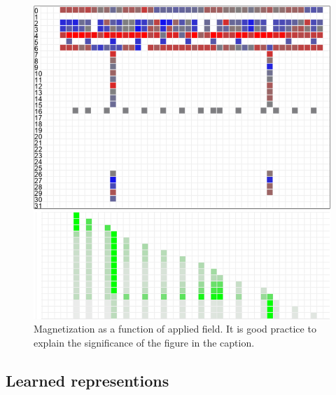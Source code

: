 \documentclass[journal,twoside,web]{ieeecolor}
\begin{document}
  \begin{figure}[!h]

    \centerline{\includegraphics{images/example.png}}
    \caption{Magnetization as a function of applied field.
    It is good practice to explain the significance of the figure in the caption.}
    \label{fig2}
\end{figure}



\subsection{Learned representions}  




\end{document}
